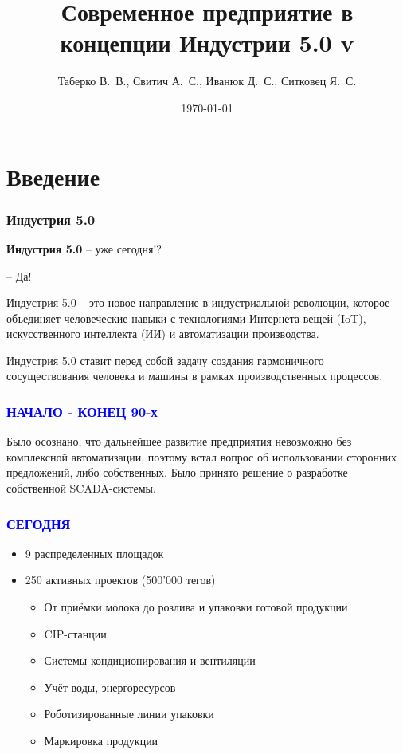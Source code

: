 \documentclass{beamer}
\title{
    Современное предприятие в концепции Индустрии 5.0
    \ifdefined\tagversion
        \newline
        \newline
        v\tagversion
    \fi}
\author{Таберко В.~В., Свитич А.~С., Иванюк Д.~С., Ситковец Я.~С.}
\institute{Савушкин продукт}
\date{\today}
\begin{document}
\frame{\titlepage}

\section{Введение}
 {
  \begin{frame}
      \frametitle{Индустрия 5.0}

      {\Large \textbf{Индустрия 5.0}} -- уже сегодня!?

      -- Да!
  \end{frame}
 }
 \begin{frame}
    Индустрия 5.0 -- это новое направление в индустриальной революции, которое объединяет человеческие навыки с технологиями Интернета вещей (IoT), искусственного интеллекта (ИИ) и автоматизации производства.
 \end{frame}

 \begin{frame}
    Индустрия 5.0 ставит перед собой задачу создания гармоничного сосуществования человека и машины в рамках производственных процессов.
 \end{frame}

 \begin{frame}
    \frametitle{\textcolor{blue}{НАЧАЛО - КОНЕЦ 90-х}}

      Было осознано, что дальнейшее развитие предприятия невозможно без комплексной автоматизации, поэтому встал вопрос об использовании сторонних предложений, либо собственных. Было принято решение о разработке собственной SCADA-системы.

 \end{frame}

 \begin{frame}
    \frametitle{\textcolor{blue}{СЕГОДНЯ}}

    \begin{itemize}
        \color{black}
        \item[\textcolor{teal}{\textbullet}] 9 распределенных площадок
        \item[\textcolor{teal}{\textbullet}] 250 активных проектов (500’000 тегов)
            \begin{itemize}
                \color{black}
                \item[\textcolor{teal}{\ding{226}}] От приёмки молока до розлива и упаковки готовой продукции
                \item[\textcolor{teal}{\ding{226}}] CIP-станции
                \item[\textcolor{teal}{\ding{226}}] Системы кондиционирования и вентиляции
                \item[\textcolor{teal}{\ding{226}}] Учёт воды, энергоресурсов
                \item[\textcolor{teal}{\ding{226}}] Роботизированные линии упаковки
                \item[\textcolor{teal}{\ding{226}}] Маркировка продукции
            \end{itemize}
    \end{itemize}
\end{frame}
\end{document}
